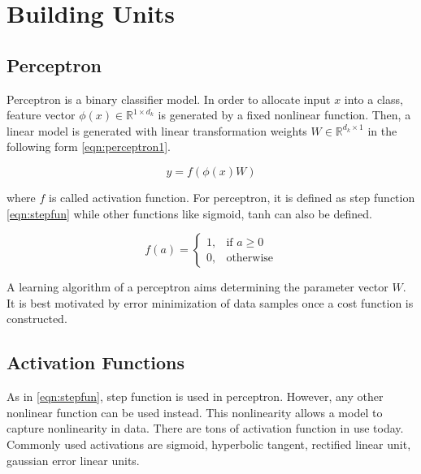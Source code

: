 \section{Building Units}
\label{sec:building_units}

\subsection{Perceptron}
Perceptron is a binary classifier model. In order to allocate input $x$ into a class, feature vector $\phi(x) \in \mathbb{R}^{1 \times d_k}$ is generated by a fixed nonlinear function. Then, a linear model is generated with linear transformation weights $W \in \mathbb{R}^{d_k \times 1} $ in the following form \ref{eqn:perceptron1}.

\begin{equation}
\label{eqn:perceptron1}
y = f(\phi(x) W)
\end{equation}

where $f$ is called activation function. For perceptron, it is defined as step function \ref{eqn:stepfun} while other functions like sigmoid, tanh can also be defined.

\begin{equation}
\label{eqn:stepfun}
f(a) = 
\begin{cases}
1,   & \text{if } a\geq 0\\
0,   & \text{otherwise}
\end{cases} 
\end{equation}

A learning algorithm of a perceptron aims determining the parameter vector $W$. It is best motivated by error minimization of data samples once a cost function is constructed. 

\subsection{Activation Functions}
As in \eqref{eqn:stepfun}, step function is used in perceptron. However, any other nonlinear function can be used instead. This nonlinearity allows a model to capture nonlinearity in data. There are tons of activation function in use today. Commonly used activations are sigmoid, hyperbolic tangent, rectified linear unit, gaussian error linear units.